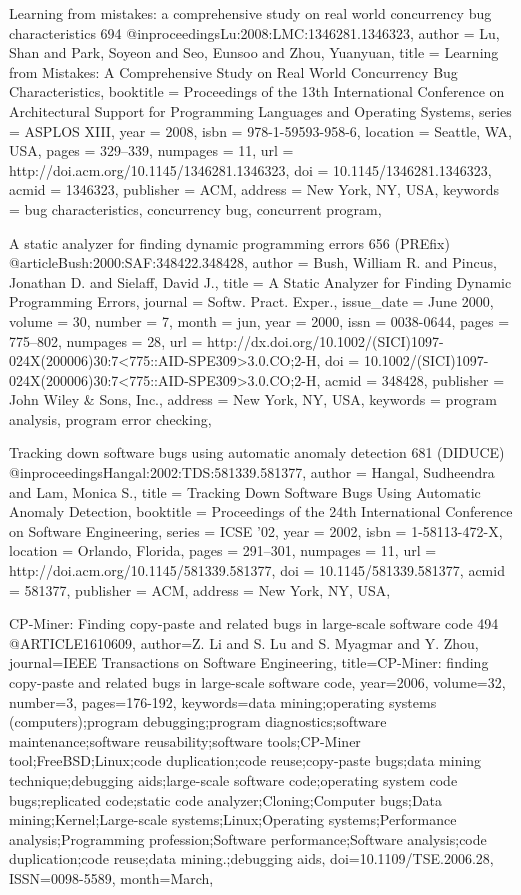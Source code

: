 \documentclass[runningheads,a4paper]{llncs}
\begin{document}
Learning from mistakes: a comprehensive study on real world concurrency bug characteristics  694
@inproceedings{Lu:2008:LMC:1346281.1346323,
 author = {Lu, Shan and Park, Soyeon and Seo, Eunsoo and Zhou, Yuanyuan},
 title = {Learning from Mistakes: A Comprehensive Study on Real World Concurrency Bug Characteristics},
 booktitle = {Proceedings of the 13th International Conference on Architectural Support for Programming Languages and Operating Systems},
 series = {ASPLOS XIII},
 year = {2008},
 isbn = {978-1-59593-958-6},
 location = {Seattle, WA, USA},
 pages = {329--339},
 numpages = {11},
 url = {http://doi.acm.org/10.1145/1346281.1346323},
 doi = {10.1145/1346281.1346323},
 acmid = {1346323},
 publisher = {ACM},
 address = {New York, NY, USA},
 keywords = {bug characteristics, concurrency bug, concurrent program},
}

A static analyzer for finding dynamic programming errors 656 (PREfix)
@article{Bush:2000:SAF:348422.348428,
 author = {Bush, William R. and Pincus, Jonathan D. and Sielaff, David J.},
 title = {A Static Analyzer for Finding Dynamic Programming Errors},
 journal = {Softw. Pract. Exper.},
 issue_date = {June 2000},
 volume = {30},
 number = {7},
 month = jun,
 year = {2000},
 issn = {0038-0644},
 pages = {775--802},
 numpages = {28},
 url = {http://dx.doi.org/10.1002/(SICI)1097-024X(200006)30:7<775::AID-SPE309>3.0.CO;2-H},
 doi = {10.1002/(SICI)1097-024X(200006)30:7<775::AID-SPE309>3.0.CO;2-H},
 acmid = {348428},
 publisher = {John Wiley \& Sons, Inc.},
 address = {New York, NY, USA},
 keywords = {program analysis, program error checking},
} 

Tracking down software bugs using automatic anomaly detection 681 (DIDUCE)
@inproceedings{Hangal:2002:TDS:581339.581377,
 author = {Hangal, Sudheendra and Lam, Monica S.},
 title = {Tracking Down Software Bugs Using Automatic Anomaly Detection},
 booktitle = {Proceedings of the 24th International Conference on Software Engineering},
 series = {ICSE '02},
 year = {2002},
 isbn = {1-58113-472-X},
 location = {Orlando, Florida},
 pages = {291--301},
 numpages = {11},
 url = {http://doi.acm.org/10.1145/581339.581377},
 doi = {10.1145/581339.581377},
 acmid = {581377},
 publisher = {ACM},
 address = {New York, NY, USA},
}

CP-Miner: Finding copy-paste and related bugs in large-scale software code 494
@ARTICLE{1610609, 
author={Z. Li and S. Lu and S. Myagmar and Y. Zhou}, 
journal={IEEE Transactions on Software Engineering}, 
title={CP-Miner: finding copy-paste and related bugs in large-scale software code}, 
year={2006}, 
volume={32}, 
number={3}, 
pages={176-192}, 
keywords={data mining;operating systems (computers);program debugging;program diagnostics;software maintenance;software reusability;software tools;CP-Miner tool;FreeBSD;Linux;code duplication;code reuse;copy-paste bugs;data mining technique;debugging aids;large-scale software code;operating system code bugs;replicated code;static code analyzer;Cloning;Computer bugs;Data mining;Kernel;Large-scale systems;Linux;Operating systems;Performance analysis;Programming profession;Software performance;Software analysis;code duplication;code reuse;data mining.;debugging aids}, 
doi={10.1109/TSE.2006.28}, 
ISSN={0098-5589}, 
month={March},}
\end{document}
